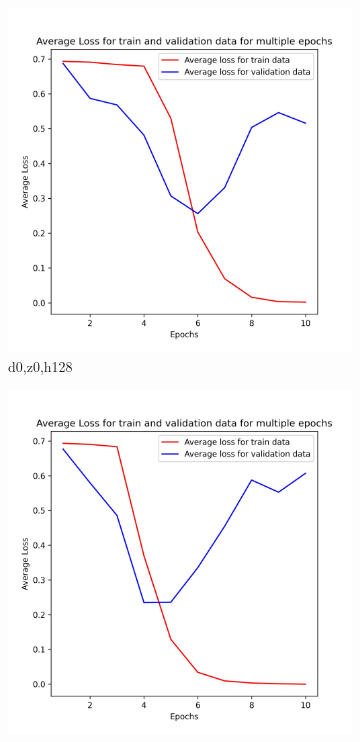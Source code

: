 \documentclass{article}
\begin{document}
\begin{figure}
	\centering
	\begin{subfigure}[b]{0.22\textwidth}
		\centering
		\includegraphics[width=\textwidth]{d0_z0_h128_1D_1.jpg}
		\caption{d0,z0,h128}
	\end{subfigure}
	\begin{subfigure}[b]{0.22\textwidth}
		\centering
		\includegraphics[width=\textwidth]{d0_z0_h128_1D_2.jpg}

\end{subfigure}
\end{figure}
\end{document}

